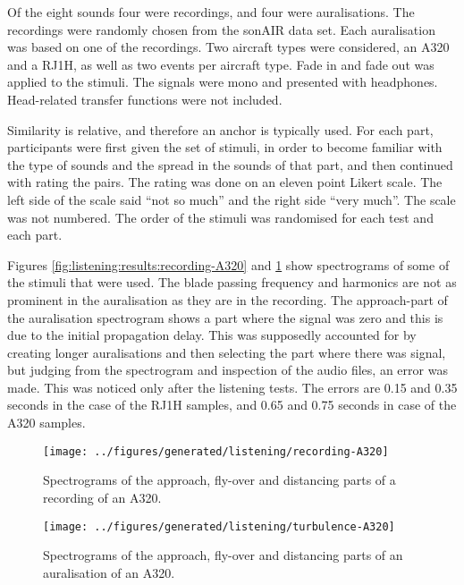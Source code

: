 Of the eight sounds four were recordings, and four were auralisations.
The recordings were randomly chosen from the sonAIR data set. Each
auralisation was based on one of the recordings. Two aircraft types were
considered, an A320 and a RJ1H, as well as two events per aircraft type.
Fade in and fade out was applied to the stimuli. The signals were mono and
presented with headphones. Head-related transfer functions were not included.

Similarity is relative, and therefore an anchor is typically used. For each
part, participants were first given the set of stimuli, in order to become
familiar with the type of sounds and the spread in the sounds of that part, and
then continued with rating the pairs. The rating was done on an eleven point
Likert scale. The left side of the scale said ``not so much'' and the right side
``very much''. The scale was not numbered. The order of the stimuli was
randomised for each test and each part.

Figures \ref{fig:listening:results:recording-A320} and
\ref{fig:listening:results:simulation-A320} show spectrograms of some of the
stimuli that were used. The blade passing frequency and harmonics are not as
prominent in the auralisation as they are in the recording. The approach-part of
the auralisation spectrogram shows a part where the signal was zero and this is
due to the initial propagation delay. This was supposedly accounted for by
creating longer auralisations and then selecting the part where there was
signal, but judging from the spectrogram and inspection of the audio files, an
error was made. This was noticed only after the listening tests. The errors are
0.15 and 0.35 seconds in the case of the RJ1H samples, and 0.65 and 0.75 seconds
in case of the A320 samples.


\begin{figure}[H]
  \centering
  \texttt{[image: ../figures/generated/listening/recording-A320]}
  \caption{Spectrograms of the approach, fly-over and distancing parts of a recording of an A320.}
  \label{fig:listening:results:recording-A320}
%
  \centering
  \texttt{[image: ../figures/generated/listening/turbulence-A320]}
  \caption{Spectrograms of the approach, fly-over and distancing parts of an auralisation of an A320.}
  \label{fig:listening:results:simulation-A320}
\end{figure}

